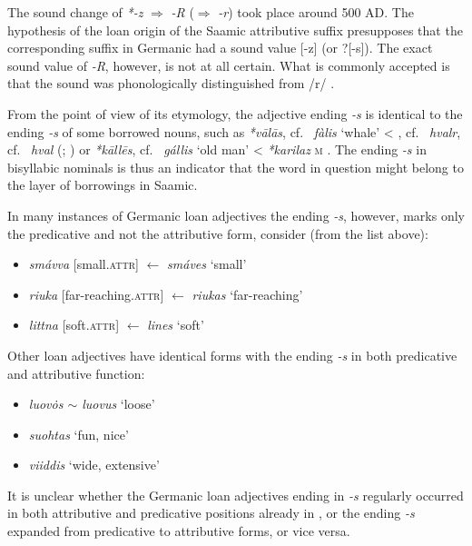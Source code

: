 {\begin{itemize}
\end{itemize}
The sound change of  \textit{*-z} $\Rightarrow$  \textit{-R} ($\Rightarrow$  \textit{-r}) took place around 500 AD. The hypothesis of the loan origin of the Saamic attributive suffix presupposes that the corresponding suffix in Germanic had a sound value [-z] (or ?[-s]). The exact sound value of \textit{-R}, however, is not at all certain. What is commonly accepted is that the sound was phonologically distinguished from /r/ \citep{skold1954}.

From the point of view of its etymology, the adjective ending \textit{-s} is identical to the ending \textit{-s} of some borrowed  nouns, such as  \textit{*vālās}, cf.~ \textit{fàlis} ‘whale’ < , cf.~ \textit{hvalr}, cf.~ \textit{hval} (\citealt[144]{qvigstad1893}; \citealt[144–145]{lehtiranta1989}) or  \textit{*kāllēs}, cf.~ \textit{gállis} ‘old man’ <  \textit{*karilaz} \textsc{m} \cite[44–45]{lehtiranta1989}. The ending \textit{-s} in bisyllabic nominals is thus an indicator that the word in question might belong to the layer of  borrowings in Saamic.

In many instances of Germanic loan adjectives the ending \textit{-s}, however, marks only the predicative and not the attributive form, consider (from the list above):
\begin{itemize}
\item {} \textit{smávva} [small.\textsc{attr}] $\leftarrow$ \textit{smáves} ‘small’
\item {} \textit{riuka} [far-reaching.\textsc{attr}] $\leftarrow$ \textit{riukas} ‘far-reaching’
\item {} \textit{littna} [soft.\textsc{attr}] $\leftarrow$ \textit{lines} ‘soft’
\end{itemize}
Other loan adjectives have identical forms with the ending \textit{-s} in both predicative and attributive function:
\begin{itemize}
\item {} \textit{luov\.{o}s $\sim$ luovus} ‘loose'
\item {} \textit{suohtas} ‘fun, nice'
\item {} \textit{viiddis} ‘wide, extensive'
\end {itemize}
It is unclear whether the Germanic loan adjectives ending in \textit{-s} regularly occurred in both attributive and predicative positions already in , or the ending \textit{-s} expanded from predicative to attributive forms, or vice versa.

}
